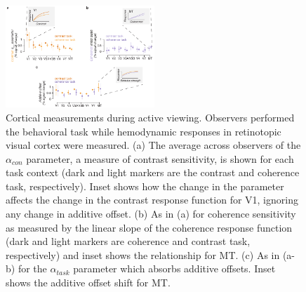 \documentclass{report}
\begin{document}
\begin{figure}
\centering
\includegraphics[keepaspectratio,width=0.5\textwidth]{figs_c2/Fig3_active.pdf}
\caption[Cortical measurements during active viewing]{Cortical measurements during active viewing. Observers performed the behavioral task while hemodynamic responses in retinotopic visual cortex were measured. (a) The average across observers of the $\alpha_{con}$ parameter, a measure of contrast sensitivity, is shown for each task context (dark and light markers are the contrast and coherence task, respectively). Inset shows how the change in the parameter affects the change in the contrast response function for V1, ignoring any change in additive offset. (b) As in (a) for coherence sensitivity as measured by the linear slope of the coherence response function (dark and light markers are coherence and contrast task, respectively) and inset shows the relationship for MT. (c) As in (a-b) for the $\alpha_{task}$ parameter which absorbs additive offsets. Inset shows the additive offset shift for MT.}
\label{fig:c4f3}
\end{figure}
\end{document}
